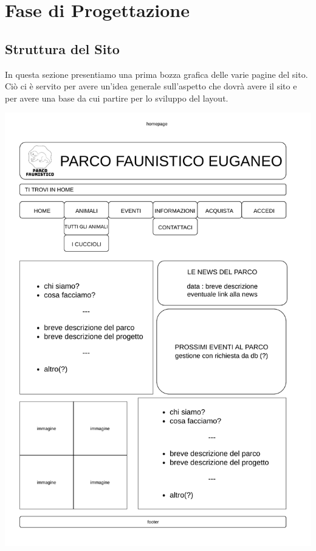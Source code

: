 \section{Fase di Progettazione}
    \subsection{Struttura del Sito}
    In questa sezione presentiamo una prima bozza grafica delle varie pagine del sito. Ciò ci è servito per avere un'idea generale sull'aspetto che dovrà avere il sito e per avere una base da cui partire per lo sviluppo del layout.

    \begin{center}
        \begin{minipage}{0.4\linewidth}
            \includegraphics[width=\linewidth]{./../docs/Analisi/bozze/homepage.pdf}

\end{minipage}
\end{center}
